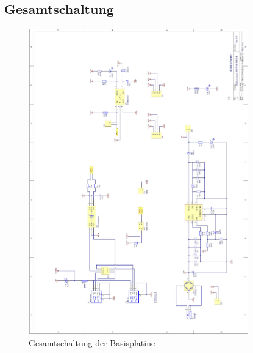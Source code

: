 \subsection{Gesamtschaltung}
\label{sec:basisplatine-schaltung}
\begin{figure}[H]
    \centering
    \includegraphics[width=0.85\textwidth]{Schuh/Pictures/Basis-Schaltung1}
    \caption[Gesamtschaltung der Basisplatine]{Gesamtschaltung der \gls{Basisplatine}}
    \label{fig:basisplatine-schaltung}
\end{figure}
